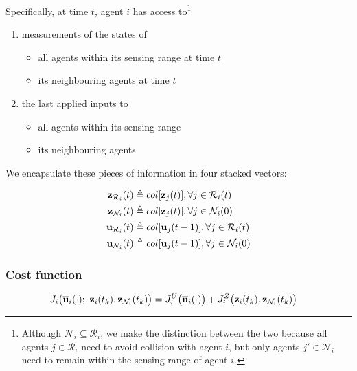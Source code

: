 Specifically, at time $t$, agent $i$ has access to\footnote{Although
    $\mathcal{N}_i \subseteq \mathcal{R}_i$, we make the distinction between
    the two because all agents $j \in \mathcal{R}_i$ need to avoid collision
    with agent $i$, but only agents $j' \in \mathcal{N}_i$ need to remain
    within the sensing range of agent $i$.}

\begin{enumerate}
  \item measurements of the states of
    \begin{itemize}
      \item all agents within its sensing range at time $t$
      \item its neighbouring agents at time $t$
      \end{itemize}
    \item the last applied inputs to
      \begin{itemize}
        \item all agents within its sensing range
        \item its neighbouring agents
      \end{itemize}
\end{enumerate}

We encapsulate these pieces of information in four stacked vectors:

\begin{align}
  \bm{\mathbf{z}}_{\mathcal{R}_i}(t) &\triangleq col[\bm{\mathbf{z}}_j(t)], \forall j \in \mathcal{R}_i(t) \\
  \bm{\mathbf{z}}_{\mathcal{N}_i}(t) &\triangleq col[\bm{\mathbf{z}}_j(t)], \forall j \in \mathcal{N}_i(0) \\
  \bm{\mathbf{u}}_{\mathcal{R}_i}(t) &\triangleq col[\bm{\mathbf{u}}_j(t-1)], \forall j \in \mathcal{R}_i(t) \\
  \bm{\mathbf{u}}_{\mathcal{N}_i}(t) &\triangleq col[\bm{\mathbf{u}}_j(t-1)], \forall j \in \mathcal{N}_i(0)
\end{align}


\subsubsection{Cost function}

\begin{align}
  J_i \big(\overline{\bm{\mathbf{u}}}_i (\cdot);\ \bm{\mathbf{z}}_i(t_k), \bm{\mathbf{z}}_{\mathcal{N}_i}(t_k)\big) &=
    J_i^U \big(\overline{\bm{\mathbf{u}}}_i (\cdot) \big) +
    J_i^Z \big(\bm{\mathbf{z}}_i (t_k), \bm{\mathbf{z}}_{\mathcal{N}_i}(t_k)\big)
\end{align}

